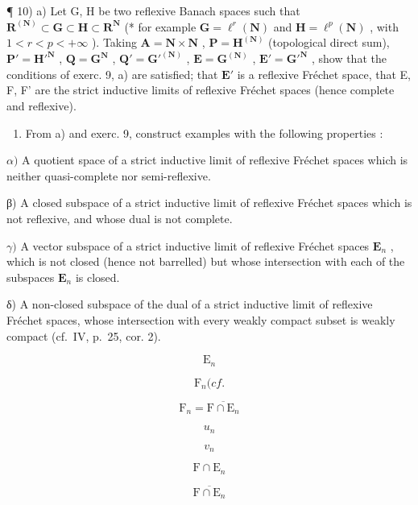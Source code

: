 ¶ 10) a) Let G, H be two reflexive Banach spaces such that \(\mathbf{R}^{(\mathbf{N})} \subset \mathbf{G} \subset \mathbf{H} \subset \mathbf{R}^{\mathbf{N}}\) (* for example \(\mathbf{G} = \ell^{r}(\mathbf{N})\) and \(\mathbf{H} = \ell^{p}(\mathbf{N})\) , with \(1 < r < p < +\infty\) ). Taking \(\mathbf{A} = \mathbf{N} \times \mathbf{N}\) , \(\mathbf{P} = \mathbf{H}^{(\mathbf{N})}\) (topological direct sum), \(\mathbf{P}' = \mathbf{H}'^{\mathbf{N}}\) , \(\mathbf{Q} = \mathbf{G}^{\mathbf{N}}\) , \(\mathbf{Q}' = \mathbf{G}'^{(\mathbf{N})}\) , \(\mathbf{E} = \mathbf{G}^{(\mathbf{N})}\) , \(\mathbf{E}' = \mathbf{G}'^{\mathbf{N}}\) , show that the conditions of exerc. 9, a) are satisfied; that \(\mathbf{E}'\) is a reflexive Fréchet space, that E, F, F' are the strict inductive limits of reflexive Fréchet spaces (hence complete and reflexive).

\begin{enumerate}
\def\labelenumi{\alph{enumi})}
\setcounter{enumi}{1}
\tightlist
\item
  From a) and exerc. 9, construct examples with the following properties :
\end{enumerate}

\(\alpha)\) A quotient space of a strict inductive limit of reflexive Fréchet spaces which is neither quasi-complete nor semi-reflexive.

β) A closed subspace of a strict inductive limit of reflexive Fréchet spaces which is not reflexive, and whose dual is not complete.

\(\gamma)\) A vector subspace of a strict inductive limit of reflexive Fréchet spaces \(\mathbf{E}_n\) , which is not closed (hence not barrelled) but whose intersection with each of the subspaces \(\mathbf{E}_n\) is closed.

δ) A non-closed subspace of the dual of a strict inductive limit of reflexive Fréchet spaces, whose intersection with every weakly compact subset is weakly compact (cf.~IV, p.~25, cor. 2).

\[
\mathrm{E} _ {n}
\]

\[
\mathrm{F} _ {n} (c f.
\]

\[
\mathrm{F} _ {n} = \overline {{\mathrm{F} \cap \mathrm{E} _ {n}}}
\]

\[
u _ {n}
\]

\[
v _ {n}
\]

\[
\mathrm{F} \cap \mathrm{E} _ {n}
\]

\[
\overline {{\mathrm{F} \cap \mathrm{E} _ {n}}}
\]

